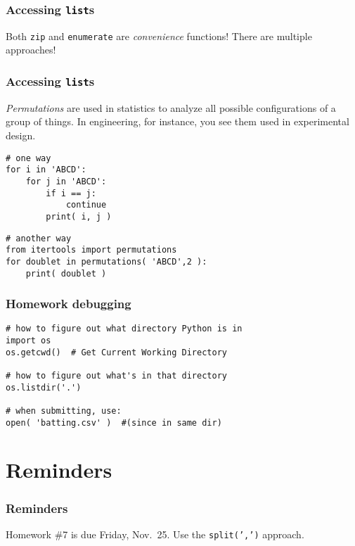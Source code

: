 \documentclass[11pt]{beamer}
\begin{document}
\begin{frame}[fragile]
  \frametitle{Accessing \texttt{list}s}
  \Enlarge

  \begin{enumerate}
  \myitem  Both \texttt{zip} and \texttt{enumerate} are \emph{convenience} functions!
  \myitem  There are multiple approaches!
  \end{enumerate}
\end{frame}

\begin{frame}[fragile]
  \frametitle{Accessing \texttt{list}s}

  \begin{enumerate}
  \myitem  \emph{Permutations} are used in statistics to analyze all possible configurations of a group of things.
  \myitem  In engineering, for instance, you see them used in experimental design.
  \end{enumerate}
  \begin{Verbatim}
# one way
for i in 'ABCD':
    for j in 'ABCD':
        if i == j:
            continue
        print( i, j )
  \end{Verbatim}
  \pause
  \begin{Verbatim}
# another way
from itertools import permutations
for doublet in permutations( 'ABCD',2 ):
    print( doublet )
  \end{Verbatim}
\end{frame}

\begin{frame}[fragile]
  \frametitle{Homework debugging}
  \Enlarge

  \begin{Verbatim}
# how to figure out what directory Python is in
import os
os.getcwd()  # Get Current Working Directory

# how to figure out what's in that directory
os.listdir('.')

# when submitting, use:
open( 'batting.csv' )  #(since in same dir)
  \end{Verbatim}
\end{frame}

\section{Reminders}

\begin{frame}
  \frametitle{Reminders}
  \Enlarge

  \begin{itemize}
  \myitem  Homework \#7 is due Friday, Nov.\ 25.
  \mysubitem  Use the \texttt{split(',')} approach.
  \end{itemize}
\end{frame}
\end{document}
